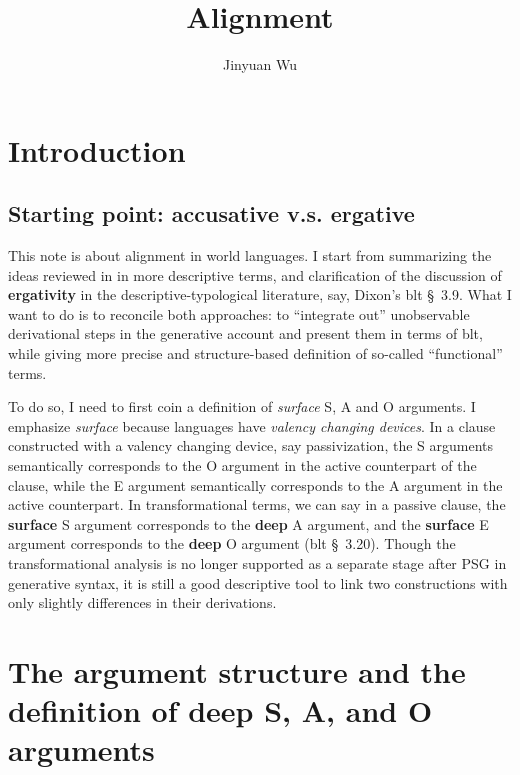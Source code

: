 \documentclass{article}
\title{Alignment}
\author{Jinyuan Wu}
\newcommand*{\citesec}[1]{\S~{#1}}
\newcommand*{\concept}[1]{\textbf{#1}}
\begin{document}
\automath

\maketitle

\section{Introduction}

\subsection{Starting point: accusative v.s. ergative}

This note is about alignment in world languages. 
I start from summarizing the ideas reviewed in \citet{aldridge2008generative} in more descriptive terms,
and clarification of the discussion of \concept{ergativity} in the descriptive-typological literature, 
say, Dixon's \ac{blt} \citesec{3.9}.
What I want to do is to reconcile both approaches:
to ``integrate out'' unobservable derivational steps in the generative account and 
present them in terms of \ac{blt}, 
while giving more precise and structure-based definition of so-called ``functional'' terms.

To do so, I need to first coin a definition of \emph{surface} S, A and O arguments.
I emphasize \emph{surface} because languages have \emph{valency changing devices}.
In a clause constructed with a valency changing device, say passivization,
the S arguments semantically corresponds to the O argument 
in the active counterpart of the clause, 
while the E argument semantically corresponds to the A argument in the active counterpart.
In transformational terms, we can say in a passive clause,
the \concept{surface} S argument corresponds to the \concept{deep} A argument,
and the \concept{surface} E argument corresponds to the \concept{deep} O argument
(\ac{blt} \citesec{3.20}).
Though the transformational analysis is no longer supported as a separate stage after PSG in generative syntax,
it is still a good descriptive tool to link two constructions with only slightly differences in their derivations.

\section{The argument structure and the definition of deep S, A, and O arguments}\label{sec:argument-structure}
\end{document}

